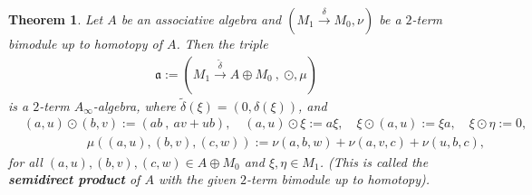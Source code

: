 \documentclass[a4paper,reqno,10pt]{amsart}
\theoremstyle{plain}
\newtheorem{thm}{Theorem}[section]
\theoremstyle{definition}
\theoremstyle{remark}
\begin{document}
\begin{thm}\label{thm-2-hom}
    Let $A$ be an associative algebra and $(M_1 \xrightarrow{\delta} M_0, \nu)$ be a $2$-term bimodule up to homotopy of $A$. Then the triple
    \begin{align*}
       \mathfrak{a} :=  ( M_1 \xrightarrow{\widetilde{\delta } } A \oplus M_0 ~ \! , ~ \! \odot, \mu )
    \end{align*}
    is a $2$-term $A_\infty$-algebra, where $\widetilde{\delta} (\xi) = (0, \delta (\xi) )$, and
    \begin{align*}
       & (a, u) \odot (b, v) := (ab ~ \! , ~ \! a v + u b), \quad (a, u) \odot \xi := a \xi, \quad \xi \odot (a, u) := \xi a, \quad \xi \odot \eta := 0,\\
       & \qquad \qquad \quad  \mu ( (a , u) , (b ,v) , (c , w ) ) := \nu (a, b, w) + \nu (a, v, c) + \nu (u, b, c),
    \end{align*}
    for all $(a, u), (b, v), (c, w) \in A \oplus M_0$ and $\xi, \eta \in M_1$. (This is called the {\bf semidirect product} of $A$ with the given $2$-term bimodule up to homotopy).
\end{thm}
\end{document}
